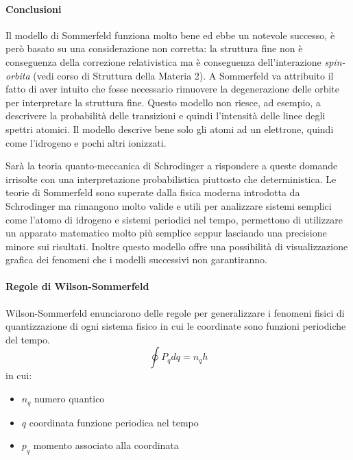 \paragraph{Conclusioni} Il modello di Sommerfeld funziona molto bene ed ebbe un notevole successo, è però basato su una considerazione non corretta: la struttura fine non è conseguenza della correzione relativistica ma è conseguenza dell'interazione \textit{spin-orbita} (vedi corso di Struttura della Materia 2).
A Sommerfeld va attribuito il fatto di aver intuito che fosse necessario rimuovere la degenerazione delle orbite per interpretare la struttura fine.
Questo modello non riesce, ad esempio, a descrivere la probabilità delle transizioni e quindi l'intensità delle linee degli spettri atomici.
Il modello descrive bene solo gli atomi ad un elettrone, quindi come l'idrogeno e pochi altri ionizzati.

Sarà la teoria quanto-meccanica di Schrodinger a rispondere a queste domande irrisolte con una interpretazione probabilistica piuttosto che deterministica.
Le teorie di Sommerfeld sono superate dalla fisica moderna introdotta da Schrodinger ma rimangono molto valide e utili per analizzare sistemi semplici come l'atomo di idrogeno e sistemi periodici nel tempo, permettono di utilizzare un apparato matematico molto più semplice seppur lasciando una precisione minore sui risultati.
Inoltre questo modello offre una possibilità di visualizzazione grafica dei fenomeni che i modelli successivi non garantiranno.


\paragraph{Regole di Wilson-Sommerfeld}
Wilson-Sommerfeld enunciarono delle regole per generalizzare i fenomeni fisici di quantizzazione di ogni sistema fisico in cui le coordinate sono funzioni periodiche del tempo.
\begin{equation}
\oint P_q dq = n_q h
\label{integrale_pq}
\end{equation}
in cui:
\begin{itemize}
\item $n_q$ numero quantico
\item $q$ coordinata funzione periodica nel tempo
\item $p_q$ momento associato alla coordinata
\end{itemize}

